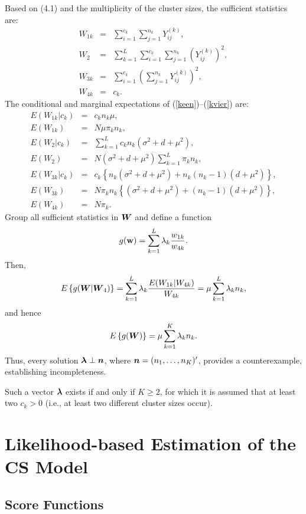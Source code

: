 \documentclass[11pt,a5paper,twoside]{book}
\newcommand{\bn}{\mbox{\boldmath $n$}}
\newcommand{\bw}{{\bf w}}
\newcommand{\BW}{\mbox{\boldmath $W$}}
\newcommand{\bflambda}{\mbox{\boldmath $\lambda$}}
\begin{document}
{Based on (4.1)
and the multiplicity of the cluster sizes, the sufficient statistics are:
\begin{eqnarray}
W_{1k}&=&\sum_{i=1}^{c_k}\sum_{j=1}^{n_k}Y_{ij}^{(k)},\label{keen}\\
W_2&=&\sum_{k=1}^L\sum_{i=1}^{c_k}\sum_{j=1}^{n_k}\left(Y_{ij}^{(k)}\right)^2,\label{ktwee}\\
W_{3k}&=&\sum_{i=1}^{c_k}\left(\sum_{j=1}^{n_k}Y_{ij}^{(k)}\right)^2,\label{kdrie}\\
W_{4k}&=&c_k.\label{kvier}
\end{eqnarray}
The conditional and marginal expectations of (\ref{keen})--(\ref{kvier}) are:
\[
\begin{aligned}
E(W_{1k}|c_k)&=&c_k n_k\mu,\\
E(W_{1k})&=&N\mu\pi_k n_k,\\
E(W_{2}|c_k)&=&\sum_{k=1}^Lc_k n_k(\sigma^2+d+\mu^2),\\
E(W_{2})&=&N(\sigma^2+d+\mu^2)\sum_{k=1}^L\pi_k n_k,\\
E(W_{3k}|c_k)&=&c_k\left\{
n_k(\sigma^2+d+\mu^2)+n_k(n_k-1)(d+\mu^2)\right\},\\
E(W_{3k})&=&N\pi_k n_k
\left\{
(\sigma^2+d+\mu^2)+(n_k-1)(d+\mu^2)
\right\}
,\\
E(W_{4k})&=&N\pi_k.
\end{aligned}
\]
Group all sufficient statistics in $\BW$ and define a function
\begin{equation}
\label{gcluster}
g(\bw)=\sum_{k=1}^L\lambda_k\frac{w_{1k}}{w_{4k}}.
\end{equation}
Then,
$$E\left\{g(\BW|\BW_4)\right\}=
\sum_{k=1}^L\lambda_k\frac{E(W_{1k}|W_{4k})}{W_{4k}}=
\mu\sum_{k=1}^L\lambda_k n_k,
$$
and hence
$$E\left\{g(\BW)\right\}=
\mu\sum_{k=1}^K\lambda_k n_k.$$
Thus, every solution $\bflambda \perp \bn$, where $\bn=(n_1,\dots,n_K)'$, provides a counterexample, establishing incompleteness.

Such a vector $\bflambda$ exists if and only if $K\ge 2$, for which it is assumed that at least two $c_k>0$ (i.e., at least two different cluster sizes occur).


\section{Likelihood-based Estimation of the CS Model}
\label{likelihoodapp}

\subsection{Score Functions}

}
\end{document}
